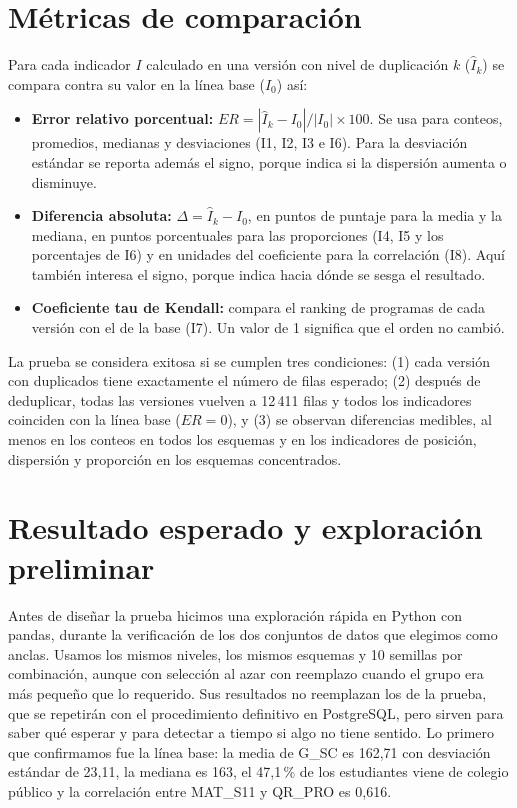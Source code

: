 \documentclass[11pt,openany,oneside,letterpaper]{book}
\begin{document}
\section{Métricas de comparación}

Para cada indicador $I$ calculado en una versión con nivel de duplicación $k$ ($\hat{I}_k$) se compara contra su valor en la línea base ($I_0$) así:

\begin{itemize}
 \item \textbf{Error relativo porcentual:} $ER = |\hat{I}_k - I_0| / |I_0| \times 100$. Se usa para conteos, promedios, medianas y desviaciones (I1, I2, I3 e I6). Para la desviación estándar se reporta además el signo, porque indica si la dispersión aumenta o disminuye.
 \item \textbf{Diferencia absoluta:} $\Delta = \hat{I}_k - I_0$, en puntos de puntaje para la media y la mediana, en puntos porcentuales para las proporciones (I4, I5 y los porcentajes de I6) y en unidades del coeficiente para la correlación (I8). Aquí también interesa el signo, porque indica hacia dónde se sesga el resultado.
 \item \textbf{Coeficiente tau de Kendall:} compara el ranking de programas de cada versión con el de la base (I7). Un valor de 1 significa que el orden no cambió.
\end{itemize}

La prueba se considera exitosa si se cumplen tres condiciones: (1) cada versión con duplicados tiene exactamente el número de filas esperado; (2) después de deduplicar, todas las versiones vuelven a 12\,411 filas y todos los indicadores coinciden con la línea base ($ER = 0$), y (3) se observan diferencias medibles, al menos en los conteos en todos los esquemas y en los indicadores de posición, dispersión y proporción en los esquemas concentrados.

\section{Resultado esperado y exploración preliminar}

Antes de diseñar la prueba hicimos una exploración rápida en Python con pandas, durante la verificación de los dos conjuntos de datos que elegimos como anclas. Usamos los mismos niveles, los mismos esquemas y 10 semillas por combinación, aunque con selección al azar con reemplazo cuando el grupo era más pequeño que lo requerido. Sus resultados no reemplazan los de la prueba, que se repetirán con el procedimiento definitivo en PostgreSQL, pero sirven para saber qué esperar y para detectar a tiempo si algo no tiene sentido. Lo primero que confirmamos fue la línea base: la media de G\_SC es 162,71 con desviación estándar de 23,11, la mediana es 163, el 47,1\,\% de los estudiantes viene de colegio público y la correlación entre MAT\_S11 y QR\_PRO es 0,616.
\end{document}
